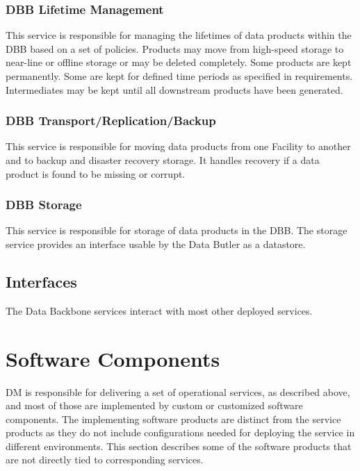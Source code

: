 \documentclass[DM,toc,lsstdraft]{lsstdoc}
\begin{document}
\subsubsection{DBB Lifetime Management}\label{dbb-lifetime-metadata}

This service is responsible for managing the lifetimes of data products within the DBB based on a set of policies.
Products may move from high-speed storage to near-line or offline storage or may be deleted completely.
Some products are kept permanently.
Some are kept for defined time periods as specified in requirements.
Intermediates may be kept until all downstream products have been generated.

\subsubsection{DBB Transport/Replication/Backup}\label{dbb-transport-repl}

This service is responsible for moving data products from one Facility to another and to backup and disaster recovery storage.
It handles recovery if a data product is found to be missing or corrupt.

\subsubsection{DBB Storage}\label{dbb-storage}

This service is responsible for storage of data products in the DBB.
The storage service provides an interface usable by the Data Butler as a datastore.

\subsection{Interfaces}\label{backbone-interfaces}

The Data Backbone services interact with most other deployed services.


\section{Software Components}\label{software-components}

DM is responsible for delivering a set of operational services, as described above, and most of those are implemented by custom or customized software components.
The implementing software products are distinct from the service products as they do not include configurations needed for deploying the service in different environments.
This section describes some of the software products that are not directly tied to corresponding services.
\end{document}
